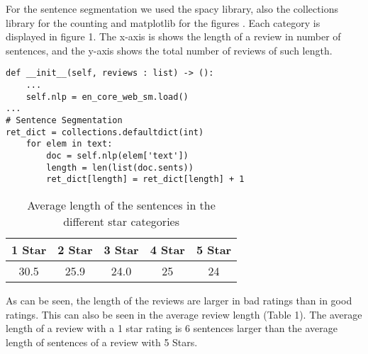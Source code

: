 For the sentence segmentation we used the spacy library, also the collections library for the counting and matplotlib for the figures . Each category is displayed in figure 1. The x-axis is shows the length of a review in number of sentences, and the y-axis shows the total number of reviews of such length.\\
\begin{Verbatim}
def __init__(self, reviews : list) -> ():
	...
	self.nlp = en_core_web_sm.load()
...
# Sentence Segmentation
ret_dict = collections.defaultdict(int)
	for elem in text:
		doc = self.nlp(elem['text'])
		length = len(list(doc.sents))
		ret_dict[length] = ret_dict[length] + 1
\end{Verbatim}
	\begin{center}
		\begin{table}[!h]
			\caption{Average length of the sentences in the different star categories}
			\begin{tabular}{c | c | c | c | c}
				1 Star & 2 Star & 3 Star  & 4 Star & 5 Star\\\hline
				30.5 & 25.9 & 24.0  & 25 & 24\\
			\end{tabular}
		\end{table}
	\end{center}
	
As can be seen, the length of the reviews are larger in bad ratings than in good ratings. This can also be seen in the average review length (Table 1). The average length of a review with a 1 star rating is 6 sentences larger than the average length of sentences of a review with 5 Stars. 
	